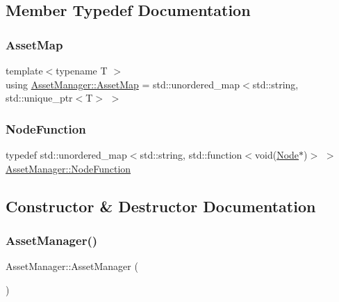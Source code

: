 \subsection{Member Typedef Documentation}
\mbox{\label{class_asset_manager_a67ef2a74c058b6cebefd838bcc3a7d96}} 
\subsubsection{\texorpdfstring{Asset\+Map}{AssetMap}}
{\footnotesize\ttfamily template$<$typename T $>$ \\
using \hyperlink{class_asset_manager_a67ef2a74c058b6cebefd838bcc3a7d96}{Asset\+Manager\+::\+Asset\+Map} =  std\+::unordered\+\_\+map$<$std\+::string, std\+::unique\+\_\+ptr$<$T$>$ $>$\hspace{0.3cm}{\ttfamily [private]}}

\mbox{\label{class_asset_manager_a681158dc461420e008e0f88312bf10e9}} 
\subsubsection{\texorpdfstring{Node\+Function}{NodeFunction}}
{\footnotesize\ttfamily typedef std\+::unordered\+\_\+map$<$std\+::string, std\+::function$<$void(\hyperlink{class_asset_manager_1_1_node}{Node}$\ast$)$>$ $>$ \hyperlink{class_asset_manager_a681158dc461420e008e0f88312bf10e9}{Asset\+Manager\+::\+Node\+Function}\hspace{0.3cm}{\ttfamily [private]}}



\subsection{Constructor \& Destructor Documentation}
\mbox{\label{class_asset_manager_a750ae7b39b633fbb6594443aa3ca704b}} 
\subsubsection{\texorpdfstring{Asset\+Manager()}{AssetManager()}}
{\footnotesize\ttfamily Asset\+Manager\+::\+Asset\+Manager (\begin{DoxyParamCaption}{ }\end{DoxyParamCaption})}

